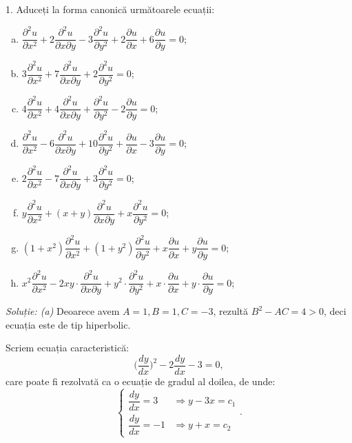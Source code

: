 1. Aduceți la forma canonică următoarele ecuații:
\begin{enumerate}[(a)]
    \item $ \dfrac{\partial^2 u}{\partial x^2} + 2 \dfrac{\partial^2 u}{\partial x \partial y} - %
        3 \dfrac{\partial^2 u}{\partial y^2} + 2 \dfrac{\partial u}{\partial x} + %
        6 \dfrac{\partial u}{\partial y} = 0 $;
    \item $ 3 \dfrac{\partial^2 u}{\partial x^2} + 7 \dfrac{\partial^2 u}{\partial x\partial y} + %
        2 \dfrac{\partial^2 u}{\partial y^2} = 0 $;
    \item $ 4 \dfrac{\partial^2 u}{\partial x^2} + 4 \dfrac{\partial^2 u}{\partial x \partial y} + %
        \dfrac{\partial^2 u}{\partial y^2} - 2 \dfrac{\partial u}{\partial y} = 0 $;
    \item $ \dfrac{\partial^2 u}{\partial x^2} - 6 \dfrac{\partial^2 u}{\partial x\partial y} + %
        10 \dfrac{\partial^2 u}{\partial y^2} + \dfrac{\partial u}{\partial x} - %
        3 \dfrac{\partial u}{\partial y} = 0 $;
    \item $ 2 \dfrac{\partial^2 u}{\partial x^2} - 7 \dfrac{\partial^2 u}{\partial x \partial y} + %
        3 \dfrac{\partial^2 u}{\partial y^2} = 0 $;
    \item $ y \dfrac{\partial^2 u}{\partial x^2} + (x + y) \dfrac{\partial^2 u}{\partial x \partial y} + %
        x \dfrac{\partial^2 u}{\partial y^2} = 0 $;
    \item $ (1 + x^2) \dfrac{\partial^2 u}{\partial x^2} + %
        (1 + y^2) \dfrac{\partial^2 u}{\partial y^2} + %
        x \dfrac{\partial u}{\partial x} + y \dfrac{\partial u}{\partial y} = 0 $;
    \item $ x^2 \dfrac{\partial^2 u}{\partial x^2} - %
        2xy \cdot \dfrac{\partial^2 u}{\partial x \partial y} + %
        y^2 \cdot \dfrac{\partial^2 u}{\partial y^2} + %
        x \cdot \dfrac{\partial u}{\partial x} + y \cdot \dfrac{\partial u}{\partial y} = 0 $;
\end{enumerate}

\emph{Soluție: (a)} Deoarece avem $ A = 1, B = 1, C = -3 $, rezultă $ B^2 - AC = 4 > 0 $,
deci ecuația este de tip hiperbolic.

Scriem ecuația caracteristică:
\[
    \Big( \dfrac{dy}{dx} \Big)^2 - 2 \dfrac{dy}{dx} - 3 = 0,
\]
care poate fi rezolvată ca o ecuație de gradul al doilea, de unde:
\[
    \begin{cases}
        \dfrac{dy}{dx} = 3 &\Rightarrow y - 3x = c_1 \\
        \dfrac{dy}{dx} = -1 &\Rightarrow y + x = c_2
    \end{cases}.
\]


